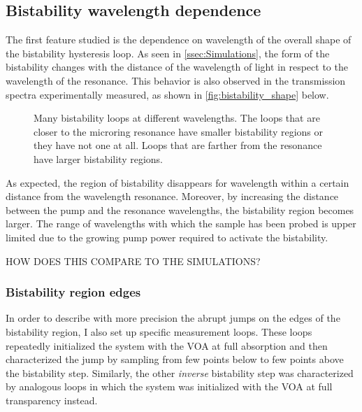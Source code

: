 \subsection{Bistability wavelength dependence}
\label{ssec:bistability_wavelength_dependence}
The first feature studied is the dependence on wavelength of the overall shape of the bistability hysteresis loop.
As seen in \autoref{ssec:Simulations}, the form of the bistability changes with the distance of the wavelength of light in respect to the wavelength of the resonance.
This behavior is also observed in the transmission spectra experimentally measured, as shown in \autoref{fig:bistability_shape} below.

\begin{figure}[hbtp]
	\centering
	
	\caption{Many bistability loops at different wavelengths.
		The loops that are closer to the microring resonance have smaller bistability regions or they have not one at all.
		Loops that are farther from the resonance have larger bistability regions.}
	\label{fig:bistability_shape}
\end{figure}

As expected, the region of bistability disappears for wavelength within a certain distance from the wavelength resonance.
Moreover, by increasing the distance between the pump and the resonance wavelengths, the bistability region becomes larger.
The range of wavelengths with which the sample has been probed is upper limited due to the growing pump power required to activate the bistability.

HOW DOES THIS COMPARE TO THE SIMULATIONS?

\subsubsection{Bistability region edges}
\label{sssec:bistability_region_edges}
In order to describe with more precision the abrupt jumps on the edges of the bistability region, I also set up specific measurement loops.
These loops repeatedly initialized the system with the VOA at full absorption and then characterized the jump by sampling from few points below to few points above the bistability step.
Similarly, the other \textit{inverse} bistability step was characterized by analogous loops in which the system was initialized with the VOA at full transparency instead.

